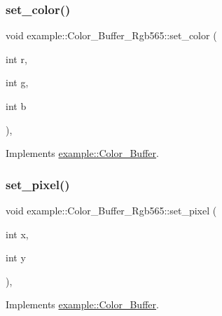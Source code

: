 \subsubsection{\texorpdfstring{set\_color()}{set\_color()}\hspace{0.1cm}{\footnotesize\ttfamily [2/2]}}
{\footnotesize\ttfamily void example\+::\+Color\+\_\+\+Buffer\+\_\+\+Rgb565\+::set\+\_\+color (\begin{DoxyParamCaption}\item[{int}]{r,  }\item[{int}]{g,  }\item[{int}]{b }\end{DoxyParamCaption})\hspace{0.3cm}{\ttfamily [inline]}, {\ttfamily [virtual]}}



Implements \mbox{\hyperlink{classexample_1_1_color___buffer_a3fbfa949ee340ccdb40ad0ce8339b827}{example\+::\+Color\+\_\+\+Buffer}}.

\mbox{\label{classexample_1_1_color___buffer___rgb565_a0f3e81af58dbe0b6456c239b24221baa}} 
\subsubsection{\texorpdfstring{set\_pixel()}{set\_pixel()}\hspace{0.1cm}{\footnotesize\ttfamily [1/2]}}
{\footnotesize\ttfamily void example\+::\+Color\+\_\+\+Buffer\+\_\+\+Rgb565\+::set\+\_\+pixel (\begin{DoxyParamCaption}\item[{int}]{x,  }\item[{int}]{y }\end{DoxyParamCaption})\hspace{0.3cm}{\ttfamily [inline]}, {\ttfamily [virtual]}}



Implements \mbox{\hyperlink{classexample_1_1_color___buffer_a967ea326ec0889a36db523727a8154b5}{example\+::\+Color\+\_\+\+Buffer}}.

\mbox{\label{classexample_1_1_color___buffer___rgb565_a53f9763360ddbb788e0dfa0ec5a0a9f9}} 
